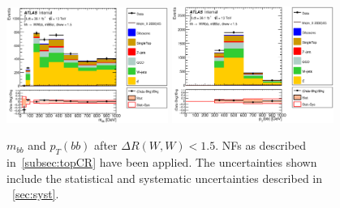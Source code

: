 \begin{figure}[!h]
\begin{center}
\includegraphics*[width=0.47\textwidth] {figures/ControlPlots/reOpt2000/C_mBBcr_reOpt2000_bbpt350_wwpt250_drww15_bbMass_regionA_met25d020.eps}
\includegraphics*[width=0.47\textwidth] {figures/ControlPlots/reOpt2000/C_mBBcr_reOpt2000_bbpt350_wwpt250_drww15_bbPt_regionA_met25d020.eps}
\caption[$m_{bb}$ and  $p_{T}(bb)$ after $\Delta R(W,W) < 1.5$.]{$m_{bb}$ and  $p_{T}(bb)$ after $\Delta R(W,W) < 1.5$.  \ttbar NFs as described in~\ref{subsec:topCR} have been applied. The uncertainties shown include the statistical and systematic uncertainties described in ~\ref{sec:syst}.}
\end{center}
\end{figure}

